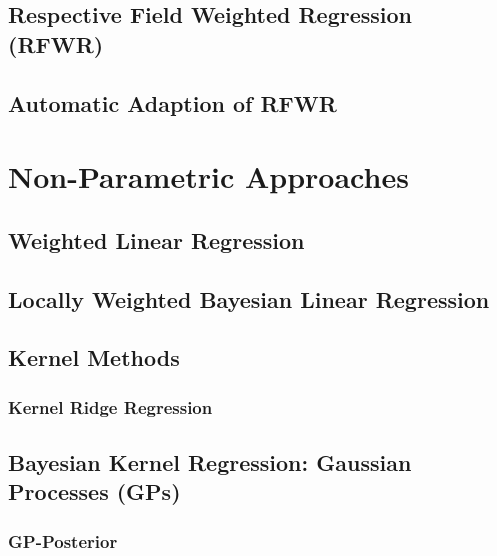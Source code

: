 		\subsection{Respective Field Weighted Regression (RFWR)} %

		\subsection{Automatic Adaption of RFWR} %

	\section{Non-Parametric Approaches} %

		\subsection{Weighted Linear Regression} %

		\subsection{Locally Weighted Bayesian Linear Regression} %

		\subsection{Kernel Methods} %

			\subsubsection{Kernel Ridge Regression} %

		\subsection{Bayesian Kernel Regression: Gaussian Processes (GPs)} %

			\subsubsection{GP-Posterior} %


